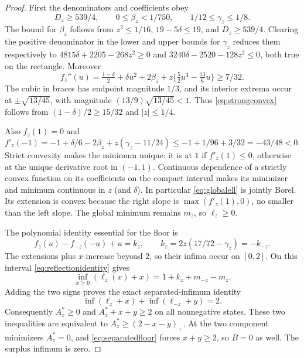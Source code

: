 \documentclass[11pt,a4paper]{amsart}
\theoremstyle{plain}
\theoremstyle{definition}
\theoremstyle{remark}
\begin{document}
\begin{proof}
First the denominators and coefficients obey
\begin{equation}\label{eq:coeffbounds}
 D_z\ge539/4,\qquad 0\le\beta_z<1/750,\qquad
 1/12\le\gamma_z\le1/8.
\end{equation}
The bound for $\beta_z$ follows from $z^2\le1/16$, $19-5\delta\le19$, and $D_z\ge539/4$. Clearing the positive denominator in the lower and upper bounds for $\gamma_z$ reduces them respectively to
$4815\delta+2205-268z^2\ge0$ and
$3240\delta-2520-128z^2\le0$, both true on the rectangle.
Moreover
\begin{equation}\label{eq:strongconvex}
 f_z''(u)=\tfrac{1-\delta}{2}+\delta u^2+2\beta_z
 +z\{\tfrac52u^3-\tfrac{13}{6}u\}\ge7/32.
\end{equation}
The cubic in braces has endpoint magnitude $1/3$, and its interior extrema occur at $\pm\sqrt{13/45}$, with magnitude $(13/9)\sqrt{13/45}<1$. Thus \eqref{eq:strongconvex} follows from $(1-\delta)/2\ge15/32$ and $|z|\le1/4$.

Also $f_z(1)=0$ and
\[
 f'_z(-1)=-1+\delta/6-2\beta_z+z(\gamma_z-11/24)
 \le-1+1/96+3/32=-43/48<0.
\]
Strict convexity makes the minimum unique: it is at $1$ if $f'_z(1)\le0$, otherwise at the unique derivative root in $(-1,1)$. Continuous dependence of a strictly convex function on its coefficients on the compact interval makes its minimizer and minimum continuous in $z$ (and $\delta$). In particular \eqref{eq:globalell} is jointly Borel. Its extension is convex because the right slope is $\max(f'_z(1),0)$, no smaller than the left slope. The global minimum remains $m_z$, so $\ell_z\ge0$.

The polynomial identity essential for the floor is
\begin{equation}\label{eq:reflectionidentity}
 f_z(u)-f_{-z}(-u)+u=k_z,
 \qquad k_z=2z(17/72-\gamma_z)=-k_{-z}.
\end{equation}
The extensions plus $x$ increase beyond $2$, so their infima occur on $[0,2]$. On this interval \eqref{eq:reflectionidentity} gives
\[
 \inf_{x\ge0}(\ell_z(x)+x)=1+k_z+m_{-z}-m_z.
\]
Adding the two signs proves the exact separated-infimum identity
\begin{equation}\label{eq:separatedfloor}
 \inf(\ell_z+x)+\inf(\ell_{-z}+y)=2.
\end{equation}
Consequently $A_z^*\ge0$ and $A_z^*+x+y\ge2$ on all nonnegative states. These two inequalities are equivalent to $A_z^*\ge(2-x-y)_+$. At the two component minimizers $A_z^*=0$, and \eqref{eq:separatedfloor} forces $x+y\ge2$, so $B=0$ as well. The surplus infimum is zero.


\end{proof}
\end{document}
